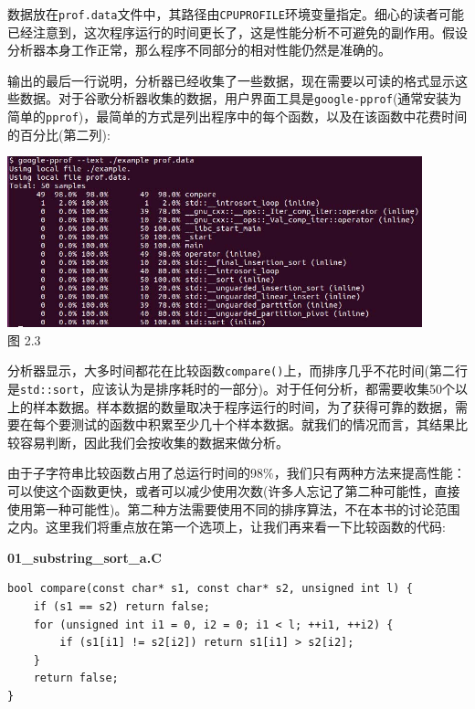 数据放在\texttt{prof.data}文件中，其路径由\texttt{CPUPROFILE}环境变量指定。细心的读者可能已经注意到，这次程序运行的时间更长了，这是性能分析不可避免的副作用。假设分析器本身工作正常，那么程序不同部分的相对性能仍然是准确的。

输出的最后一行说明，分析器已经收集了一些数据，现在需要以可读的格式显示这些数据。对于谷歌分析器收集的数据，用户界面工具是\texttt{google-pprof}(通常安装为简单的\texttt{pprof})，最简单的方式是列出程序中的每个函数，以及在该函数中花费时间的百分比(第二列):

\begin{center}
\includegraphics[width=0.9\textwidth]{content/1/chapter2/images/3.jpg}\\
图 2.3
\end{center}

分析器显示，大多时间都花在比较函数\texttt{compare()}上，而排序几乎不花时间(第二行是\texttt{std::sort}，应该认为是排序耗时的一部分)。对于任何分析，都需要收集50个以上的样本数据。样本数据的数量取决于程序运行的时间，为了获得可靠的数据，需要在每个要测试的函数中积累至少几十个样本数据。就我们的情况而言，其结果比较容易判断，因此我们会按收集的数据来做分析。

由于子字符串比较函数占用了总运行时间的98\%，我们只有两种方法来提高性能：可以使这个函数更快，或者可以减少使用次数(许多人忘记了第二种可能性，直接使用第一种可能性)。第二种方法需要使用不同的排序算法，不在本书的讨论范围之内。这里我们将重点放在第一个选项上，让我们再来看一下比较函数的代码:

\noindent
\textbf{01\_substring\_sort\_a.C}
\begin{lstlisting}[style=styleCXX]
bool compare(const char* s1, const char* s2, unsigned int l) {
	if (s1 == s2) return false;
	for (unsigned int i1 = 0, i2 = 0; i1 < l; ++i1, ++i2) {
		if (s1[i1] != s2[i2]) return s1[i1] > s2[i2];
	}
	return false;
}
\end{lstlisting}

